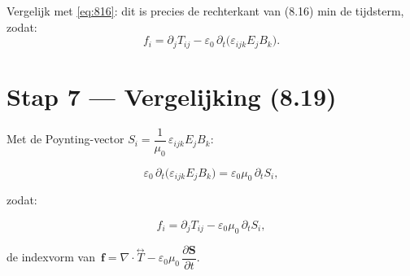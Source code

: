 \documentclass[12pt,a4paper]{article}
\begin{document}
Vergelijk met \eqref{eq:816}: dit is precies de rechterkant van (8.16) min de tijdsterm,
zodat:
\begin{equation}
    f_i = \partial_j T_{ij} - \varepsilon_0\,\partial_t\!\bigl(\varepsilon_{ijk}E_j B_k\bigr).
\end{equation}

\section*{Stap 7 — Vergelijking (8.19)}

Met de Poynting-vector $S_i = \dfrac{1}{\mu_0}\,\varepsilon_{ijk}E_j B_k$:

\begin{equation}
    \varepsilon_0\,\partial_t\!\bigl(\varepsilon_{ijk}E_j B_k\bigr)
    = \varepsilon_0\mu_0\,\partial_t S_i,
\end{equation}

zodat:

\begin{equation}
\boxed{
    f_i = \partial_j T_{ij} - \varepsilon_0\mu_0\,\partial_t S_i,
}
\end{equation}

de indexvorm van $\,\mathbf{f} = \nabla\cdot\overset{\leftrightarrow}{T}
- \varepsilon_0\mu_0\,\dfrac{\partial\mathbf{S}}{\partial t}$.
\end{document}
